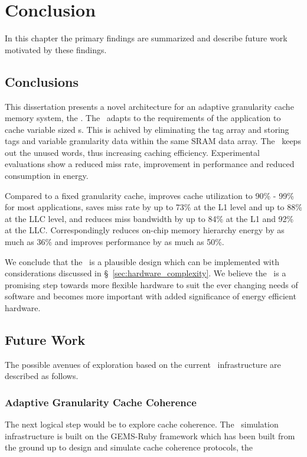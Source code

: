 
%
%

\chapter{Conclusion}
\label{chap:conclusions}

In this chapter the primary findings are summarized and describe future work motivated by these findings. 

\section{Conclusions}

This dissertation presents a novel architecture for an adaptive granularity cache memory system, the \AC{}. The \AC\ adapts to the requirements of the application to cache variable sized \AB{}s. This is achived by eliminating the tag array and storing tags and variable granularity data within the same SRAM data array. The \AC\ keeps out the unused words, thus increasing caching efficiency. Experimental evaluations show a reduced miss rate, improvement in performance and reduced consumption in energy. 

Compared to a fixed granularity cache, improves cache utilization to 90\% - 99\% for most applications, saves miss rate by up to 73\% at the L1 level and up to 88\% at the LLC level, and reduces miss bandwidth by up to 84\% at the L1 and 92\% at the LLC. Correspondingly reduces on-chip memory hierarchy energy by as much as 36\% and improves performance by as much as 50\%.

We conclude that the \AC\ is a plausible design which can be implemented with considerations discussed in \S~\ref{sec:hardware_complexity}. We believe the \AC\ is a promising step towards more flexible hardware to suit the ever changing needs of software and becomes more important with added significance of energy efficient hardware.

\section{Future Work}
The possible avenues of exploration based on the current \AC\ infrastructure are described as follows.

\subsection{Adaptive Granularity Cache Coherence}
The next logical step would be to explore cache coherence. The \AC\ simulation infrastructure is built on the GEMS-Ruby framework which has been built from the ground up to design and simulate cache coherence protocols, the 

